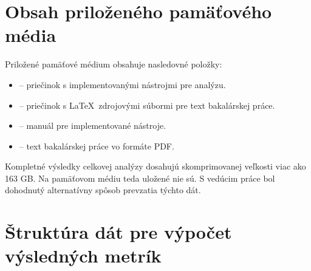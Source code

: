\chapter{Obsah priloženého pamäťového média}

Priložené pamäťové médium obsahuje nasledovné položky:

\begin{itemize}
    \item {} -- priečinok s implementovanými nástrojmi pre analýzu.
    \item {} -- priečinok s \LaTeX\  zdrojovými súbormi pre text bakalárskej práce.
    \item {} -- manuál pre implementované nástroje.
    \item {} -- text bakalárskej práce vo formáte PDF.
\end{itemize}

\noindent Kompletné výsledky celkovej analýzy dosahujú skomprimovanej veľkosti viac ako 163 GB. 
Na pamäťovom médiu teda uložené nie sú. 
S vedúcim práce bol dohodnutý alternatívny spôsob prevzatia týchto dát.

\chapter{Štruktúra dát pre výpočet výsledných metrík}

